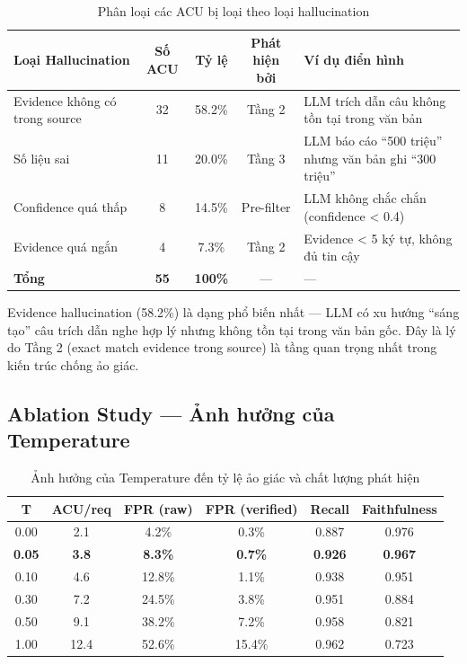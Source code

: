 \begin{table}[H]
    \centering
    \caption{Phân loại các ACU bị loại theo loại hallucination}
    \label{tab:hallucination_breakdown}
    \begin{tabularx}{\textwidth}{X c c c X}
        \toprule
        \textbf{Loại Hallucination} & \textbf{Số ACU} & \textbf{Tỷ lệ} & \textbf{Phát hiện bởi} & \textbf{Ví dụ điển hình}\\
        \midrule
        Evidence không có trong source & 32 & 58.2\% & Tầng 2 & LLM trích dẫn câu không tồn tại trong văn bản\\
        Số liệu sai & 11 & 20.0\% & Tầng 3 & LLM báo cáo ``500 triệu'' nhưng văn bản ghi ``300 triệu''\\
        Confidence quá thấp & 8 & 14.5\% & Pre-filter & LLM không chắc chắn (confidence < 0.4)\\
        Evidence quá ngắn & 4 & 7.3\% & Tầng 2 & Evidence < 5 ký tự, không đủ tin cậy\\
        \midrule
        \textbf{Tổng} & \textbf{55} & \textbf{100\%} & — & —\\
        \bottomrule
    \end{tabularx}
\end{table}

Evidence hallucination (58.2\%) là dạng phổ biến nhất — LLM có xu hướng ``sáng tạo'' câu trích dẫn nghe hợp lý nhưng không tồn tại trong văn bản gốc. Đây là lý do Tầng 2 (exact match evidence trong source) là tầng quan trọng nhất trong kiến trúc chống ảo giác.

\subsection{Ablation Study — Ảnh hưởng của Temperature}

\begin{table}[H]
    \centering
    \caption{Ảnh hưởng của Temperature đến tỷ lệ ảo giác và chất lượng phát hiện}
    \label{tab:temperature_ablation}
    \begin{tabularx}{\textwidth}{c c c c c c}
        \toprule
        \textbf{T} & \textbf{ACU/req} & \textbf{FPR (raw)} & \textbf{FPR (verified)} & \textbf{Recall} & \textbf{Faithfulness}\\
        \midrule
        0.00 & 2.1 & 4.2\% & 0.3\% & 0.887 & 0.976\\
        \textbf{0.05} & \textbf{3.8} & \textbf{8.3\%} & \textbf{0.7\%} & \textbf{0.926} & \textbf{0.967}\\
        0.10 & 4.6 & 12.8\% & 1.1\% & 0.938 & 0.951\\
        0.30 & 7.2 & 24.5\% & 3.8\% & 0.951 & 0.884\\
        0.50 & 9.1 & 38.2\% & 7.2\% & 0.958 & 0.821\\
        1.00 & 12.4 & 52.6\% & 15.4\% & 0.962 & 0.723\\
        \bottomrule
    \end{tabularx}
\end{table}

